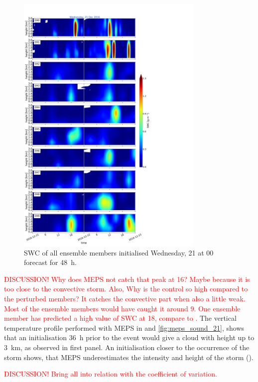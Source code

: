 \begin{figure}[t]
	\centering
	\includegraphics[trim={0cm 0cm 18.3cm 5.1cm},clip,width=0.8\textwidth]{./fig_09EM/20161221}
	\caption{SWC of all ensemble members initialised Wednesday, \SI{21}{\dec} at 0\SI{0}{\UTC} forecast for \SI{48}{\hour}.}\label{fig:EM09_21}
\end{figure}
%
\textcolor{red}{DISCUSSION! Why does MEPS not catch that peak at \SI{16}{\UTC}? Maybe because it is too close to the convective storm. Also, Why is the control so high compared to the perturbed members? It catches the convective part when also a little weak. Most of the ensemble members would have caught it around \SI{9}{\UTC}. One ensemble member has predicted a high value of SWC at \SI{18}{\UTC}, compare to .}
\newline \noindent
The vertical temperature profile performed with MEPS in  and \ref{fig:meps_sound_21}, shows that an initialisation \SI{36}{\hour} prior to the event would give a cloud with height up to \SI{3}{\km}, as observed in  first panel. An initialisation closer to the occurrence of the storm shows, that MEPS underestimates the intensity and height of the storm ().
%

\textcolor{red}{DISCUSSION! Bring all into relation with the coefficient of variation.}


